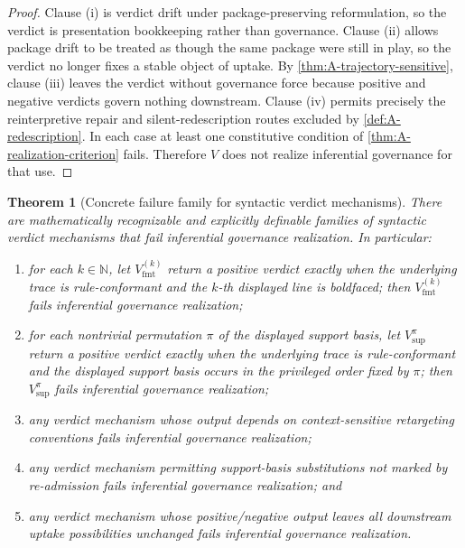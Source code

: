\documentclass[11pt]{article}
\theoremstyle{plain}
\newtheorem{theorem}{Theorem}[section]
\theoremstyle{definition}
\begin{document}
\begin{proof}
Clause (i) is verdict drift under package-preserving reformulation, so the verdict is presentation bookkeeping rather than governance. Clause (ii) allows package drift to be treated as though the same package were still in play, so the verdict no longer fixes a stable object of uptake. By \cref{thm:A-trajectory-sensitive}, clause (iii) leaves the verdict without governance force because positive and negative verdicts govern nothing downstream. Clause (iv) permits precisely the reinterpretive repair and silent-redescription routes excluded by \cref{def:A-redescription}. In each case at least one constitutive condition of \cref{thm:A-realization-criterion} fails. Therefore $V$ does not realize inferential governance for that use.
\end{proof}

\begin{theorem}[Concrete failure family for syntactic verdict mechanisms]
\label{thm:A-concrete-failure-family}
There are mathematically recognizable and explicitly definable families of syntactic verdict mechanisms that fail inferential governance realization. In particular:
\begin{enumerate}[label=(\alph*), leftmargin=2.5em]
    \item for each $k\in\mathbb{N}$, let $V^{(k)}_{\mathrm{fmt}}$ return a positive verdict exactly when the underlying trace is rule-conformant and the $k$-th displayed line is boldfaced; then $V^{(k)}_{\mathrm{fmt}}$ fails inferential governance realization;
    \item for each nontrivial permutation $\pi$ of the displayed support basis, let $V^{\pi}_{\mathrm{sup}}$ return a positive verdict exactly when the underlying trace is rule-conformant and the displayed support basis occurs in the privileged order fixed by $\pi$; then $V^{\pi}_{\mathrm{sup}}$ fails inferential governance realization;
    \item any verdict mechanism whose output depends on context-sensitive retargeting conventions fails inferential governance realization;
    \item any verdict mechanism permitting support-basis substitutions not marked by re-admission fails inferential governance realization; and
    \item any verdict mechanism whose positive/negative output leaves all downstream uptake possibilities unchanged fails inferential governance realization.
\end{enumerate}
\end{theorem}
\end{document}
